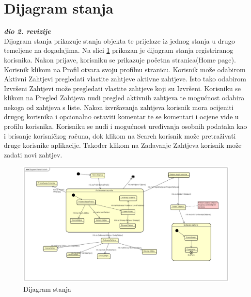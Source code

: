 			

\newpage			
\section{Dijagram stanja}
			
			\textbf{\textit{dio 2. revizije}}\\		
		
		\text Dijagram stanja prikazuje stanja objekta te prijelaze iz jednog stanja u drugo temeljene na dogadajima. Na slici
		\ref{fig:4.10} prikazan je dijagram stanja registriranog korisnika. Nakon prijave, korisniku se prikazuje početna stranica(Home page). Korisnik klikom na Profil otvara svoju profilnu stranicu. Korisnik može odabirom Aktivni Zahtjevi pregledati vlastite zahtjeve aktivne zahtjeve. Isto tako odabirom Izvršeni Zahtjevi može pregledati vlastite zahtjeve koji su Izvršeni. Korisniku se klikom na Pregled Zahtjeva nudi pregled aktivnih zahtjeva te mogućnost odabira nekoga od zahtjeva s liste. Nakon izvršavanja zahtjeva korisnik mora ocijeniti drugog korisnika i opcionalno ostaviti komentar te se komentari i ocjene vide u profilu korisnika. Korisniku se nudi i mogućnost uređivanja osobnih podataka kao i brisanje korisničkog računa, dok klikom  na Search korisnik može pretraživati druge korisnike aplikacije. Također klikom na Zadavanje Zahtjeva korisnik može zadati novi zahtjev.
		
		\begin{figure}[H]
			\includegraphics[scale=0.3]{slike/Dijagram Stanja.png} %
			\centering
			\caption { Dijagram stanja}
			\label{fig:4.10}
			\end{figure}		
			

